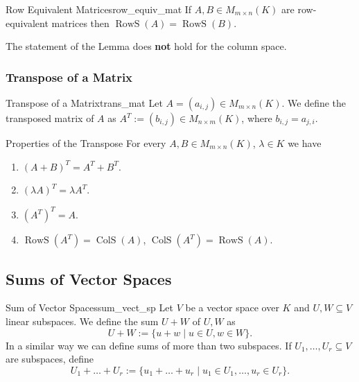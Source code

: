 \begin{lemma}{Row Equivalent Matrices}{row_equiv_mat}
	If $A, B \in M_{m\times n}(K)$ are row-equivalent matrices then $\operatorname{RowS}(A) = \operatorname{RowS}(B)$.
\end{lemma}

\begin{remark}
	The statement of the Lemma does \textbf{not} hold for the column space.
\end{remark}

\subsubsection{Transpose of a Matrix}

\begin{definition}{Transpose of a Matrix}{trans_mat}
	Let $A = (a_{i,j}) \in M_{m \times n}(K)$. We define the transposed matrix of $A$ as $A^{T} := (b_{i,j}) \in M_{n \times m}(K)$, where $b_{i,j} = a_{j,i}$.
\end{definition}

\begin{lemma}{Properties of the Transpose}{}
	For every $A, B \in M_{m \times n}(K)$, $\lambda \in K$ we have
	\begin{enumerate}
		\item $(A + B)^T = A^T + B^T$.
		\item $(\lambda A)^T = \lambda A^T$.
		\item $(A^T)^T = A.$
		\item $\operatorname{RowS}(A^T) = \operatorname{ColS}(A)$, $\operatorname{ColS}(A^T) = \operatorname{RowS}(A)$.
	\end{enumerate}
\end{lemma}

\subsection{Sums of Vector Spaces}

\begin{definition}{Sum of Vector Spaces}{sum_vect_sp}
	Let $V$ be a vector space over $K$ and $U, W \subseteq V$ linear subspaces. We define the sum $U + W$ of $U, W$ as 
	\[
		U + W := \{u + w \;|\; u \in U, w \in W\}.
	\]
	In a similar way we can define sums of more than two subspaces. If $U_1, \hdots , U_r \subseteq V$ are subspaces, define 
	\[
		U_1 + \hdots + U_r := \{u_1 + \hdots + u_r \;|\; u_1 \in U_1, \hdots , u_r \in U_r\}.
	\]
\end{definition}

